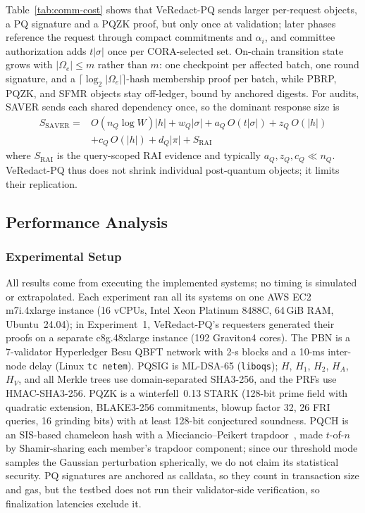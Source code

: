 \documentclass[lettersize,journal]{IEEEtran}
\begin{document}
Table~\ref{tab:comm-cost} shows that VeRedact-PQ sends larger
per-request objects, a PQ signature and a PQZK proof, but only once at
validation; later phases reference the request through compact
commitments and $\alpha_i$, and committee authorization adds $t|\sigma|$
once per CORA-selected set. On-chain transition state grows with
$|\Omega_e|\leq m$ rather than $m$: one checkpoint per affected batch,
one round signature, and a $\lceil\log_2|\Omega_e|\rceil$-hash membership
proof per batch, while PBRP, PQZK, and SFMR objects stay off-ledger,
bound by anchored digests. For audits, SAVER sends each shared
dependency once, so the dominant response size is
\begin{equation}
\begin{aligned}
S_{\mathrm{SAVER}}
={}&O(n_Q\log W)|h|
+w_Q|\sigma|
+a_Q\,O(t|\sigma|)
+z_Q\,O(|h|)\\
&+c_Q\,O(|h|)
+d_Q|\pi|
+S_{\mathrm{RAI}}
\end{aligned}
\label{eq:saver_comm}
\end{equation}
where $S_{\mathrm{RAI}}$ is the query-scoped RAI evidence and typically
$a_Q,z_Q,c_Q\ll n_Q$. VeRedact-PQ thus does not shrink individual
post-quantum objects; it limits their replication.


\subsection{Performance Analysis}
\label{subsec:performance-analysis}

\subsubsection*{\textbf{Experimental Setup}}
All results come from executing the implemented systems; no timing is
simulated or extrapolated. Each experiment ran all its systems on one
AWS EC2 m7i.4xlarge instance (16 vCPUs, Intel Xeon Platinum 8488C,
64\,GiB RAM, Ubuntu~24.04); in Experiment~1, VeRedact-PQ's requesters
generated their proofs on a separate c8g.48xlarge instance (192
Graviton4 cores). The PBN is a 7-validator Hyperledger Besu QBFT network
with 2-s blocks and a 10-ms inter-node delay (Linux \texttt{tc netem}).
PQSIG is ML-DSA-65 (\texttt{liboqs}); $H$, $H_1$, $H_2$, $H_A$, $H_V$,
and all Merkle trees use domain-separated SHA3-256, and the PRFs use
HMAC-SHA3-256. PQZK is a winterfell~0.13 STARK (128-bit prime field with
quadratic extension, BLAKE3-256 commitments, blowup factor 32, 26 FRI
queries, 16 grinding bits) with at least 128-bit conjectured
soundness. PQCH is an SIS-based chameleon hash with a
Micciancio--Peikert trapdoor~\cite{ref10,ref17}, made $t$-of-$n$ by
Shamir-sharing each member's trapdoor component; since our threshold
mode samples the Gaussian perturbation spherically, we do not claim its
statistical security. PQ signatures are anchored as calldata, so they
count in transaction size and gas, but the testbed does not run their
validator-side verification, so finalization latencies exclude it.
\end{document}
